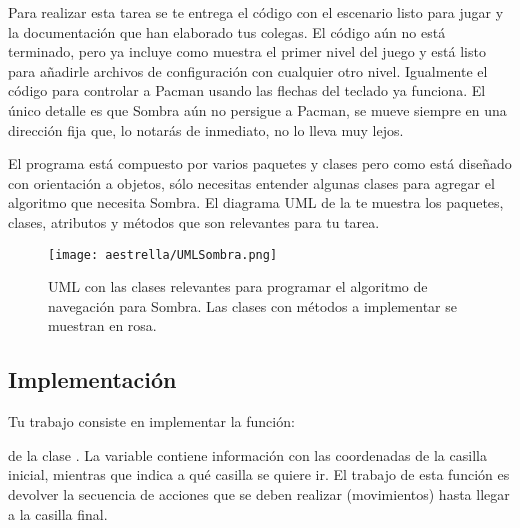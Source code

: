 Para realizar esta tarea se te entrega el código con el escenario listo para jugar y la documentación que han elaborado tus colegas.  El código aún no está terminado, pero ya incluye como muestra el primer nivel del juego y está listo para añadirle archivos de configuración con cualquier otro nivel.  Igualmente el código para controlar a Pacman usando las flechas del teclado ya funciona.  El único detalle es que Sombra aún no persigue a Pacman, se mueve siempre en una dirección fija que, lo notarás de inmediato, no lo lleva muy lejos.

El programa está compuesto por varios paquetes y clases pero como está diseñado con orientación a objetos, sólo necesitas entender algunas clases para agregar el algoritmo que necesita Sombra.  El diagrama UML de la  te muestra los paquetes, clases, atributos y métodos que son relevantes para tu tarea.

\begin{sidewaysfigure}
  \centering
  \texttt{[image: aestrella/UMLSombra.png]}
  \caption{UML con las clases relevantes para programar el algoritmo de navegación para Sombra.  Las clases con métodos a implementar se muestran en rosa.}
  \label{fig:umlestrella}
\end{sidewaysfigure}

\subsection{Implementaci\'on}

Tu trabajo consiste en implementar la función:


\noindent de la clase .
La variable  contiene información con las coordenadas de la casilla inicial, mientras que  indica a qué casilla se quiere ir.  El trabajo de esta función es devolver la secuencia de acciones que se deben realizar (movimientos) hasta llegar a la casilla final.

